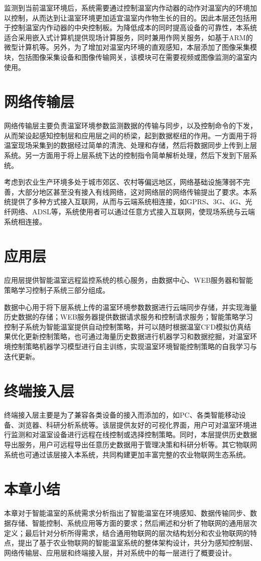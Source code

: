 监测到当前温室环境后，系统需要通过控制温室内作动器的动作对温室内的环境加以控制，从而达到让温室环境更加适宜温室内作物生长的目的。因此本层还包括用于控制温室内作动器的中央控制板。为降低成本的同时提高设备的可靠性，本系统适合采用嵌入式计算机提供现场计算服务，同时兼用作网关服务，如基于ARM的微型计算机等。另外，为了增加对温室内环境的直观感知，本层添加了图像采集模块，包括图像采集设备和图像传输网关，该模块可在需要视频或图像监测的温室内使用。
\section{网络传输层}
网络传输层主要负责温室环境参数监测数据的传输与同步，以及控制命令的下发，从而架设起感知控制层和应用层之间的桥梁，起到数据枢纽的作用。一方面用于将温室现场采集到的数据经过简单的清洗、处理和存储，然后将数据同步上传到上层系统。另一方面用于将上层系统下达的控制指令简单解析处理，然后下发到下层系统。

考虑到农业生产环境多处于城市郊区、农村等偏远地区，网络基础设施薄弱不完善，大部分地区甚至没有接入有线网络，这对网络层的网络传输提出了要求。本系统提供了多种方式接入互联网，从而与云端系统相连接，如GPRS、3G、4G、光纤网络、ADSL等，系统使用者可以通过任意方式接入互联网，使现场系统与云端系统相连接。

\section{应用层}
应用层提供智能温室远程监控系统的核心服务，由数据中心、WEB服务器和智能策略学习控制子系统三部分组成。

数据中心用于将下层系统上传的温室环境参数数据进行云端同步存储，并实现海量历史数据的存储；WEB服务器提供数据请求服务和控制请求服务；智能策略学习控制子系统为智能温室提供自动控制策略，并可以随时根据温室CFD模拟仿真结果优化更新控制策略，也可通过海量历史数据进行机器学习和数据挖掘，对温室环境控制策略机器学习模型进行自主训练，实现温室环境智能控制策略的自我学习与迭代更新。

\section{终端接入层}
 终端接入层主要是为了兼容各类设备的接入而添加的，如PC、各类智能移动设备、浏览器、科研分析系统等。该层提供友好的可视化界面，用户可对温室环境进行监测和对温室设备进行远程在线控制或选择控制策略。同时，本层提供历史数据导出服务，用户可远程导出任意历史数据用于管理决策和科研分析等。其它物联网系统也可通过该层接入本系统，共同构建更加丰富完整的农业物联网生态系统。
 
\section{本章小结}
本章对于智能温室的系统需求分析指出了智能温室在环境感知、数据传输同步、数据存储、智能控制、系统应用等方面的要求；然后阐述和分析了物联网的通用层次定义；最后针对分析所得需求，结合通用物联网的层次结构划分和农业物联网的特点，提出了基于农业物联网的智能温室系统的整体架构设计，共分为感知控制层、网络传输层、应用层和终端接入层，并对系统中的每一层进行了概要设计。